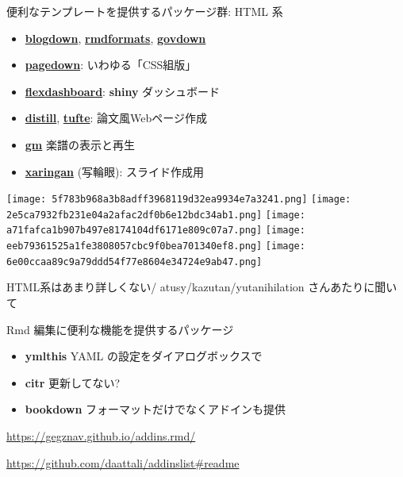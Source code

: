 \documentclass[
  ignorenonframetext,
]{beamer}
\providecommand{\tightlist}{%
  \setlength{\itemsep}{0pt}\setlength{\parskip}{0pt}}
\begin{document}
\begin{frame}{便利なテンプレートを提供するパッケージ群: HTML 系}
\protect\hypertarget{ux4fbfux5229ux306aux30c6ux30f3ux30d7ux30ecux30fcux30c8ux3092ux63d0ux4f9bux3059ux308bux30d1ux30c3ux30b1ux30fcux30b8ux7fa4-html-ux7cfb}{}
\begin{itemize}
\item
  \href{https://github.com/rstudio/blogdown}{\textbf{blogdown}},
  \href{https://github.com/juba/rmdformats}{\textbf{rmdformats}},
  \href{https://ukgovdatascience.github.io/govdown/}{\textbf{govdown}}
\item
  \href{https://github.com/rstudio/pagedown}{\textbf{pagedown}}:
  いわゆる「CSS組版」
\item
  \href{https://rmarkdown.rstudio.com/flexdashboard/}{\textbf{flexdashboard}}:
  \textbf{shiny} ダッシュボード
\item
  \href{https://rstudio.github.io/distill/}{\textbf{distill}},
  \href{https://rstudio.github.io/tufte/}{\textbf{tufte}}: 論文風Webページ作成
\item
  \href{https://flujoo.github.io/gm/}{\textbf{gm}} 楽譜の表示と再生
\item
  \href{https://github.com/yihui/xaringan}{\textbf{xaringan}} (写輪眼):
  スライド作成用
\end{itemize}

\begin{center}

\texttt{[image: 5f783b968a3b8adff3968119d32ea9934e7a3241.png]}
\texttt{[image: 2e5ca7932fb231e04a2afac2df0b6e12bdc34ab1.png]}
\texttt{[image: a71fafca1b907b497e8174104df6171e809c07a7.png]}
\texttt{[image: eeb79361525a1fe3808057cbc9f0bea701340ef8.png]}
\texttt{[image: 6e00ccaa89c9a79ddd54f77e8604e34724e9ab47.png]}

\end{center}

HTML系はあまり詳しくない/ atusy/kazutan/yutanihilation
さんあたりに聞いて
\end{frame}

\begin{frame}{Rmd 編集に便利な機能を提供するパッケージ}
\protect\hypertarget{rmd-ux7de8ux96c6ux306bux4fbfux5229ux306aux6a5fux80fdux3092ux63d0ux4f9bux3059ux308bux30d1ux30c3ux30b1ux30fcux30b8}{}
\begin{itemize}
\tightlist
\item
  \textbf{ymlthis} YAML の設定をダイアログボックスで
\item
  \textbf{citr} 更新してない?
\item
  \textbf{bookdown} フォーマットだけでなくアドインも提供
\end{itemize}

\url{https://gegznav.github.io/addins.rmd/}

\url{https://github.com/daattali/addinslist\#readme}
\end{frame}
\end{document}
